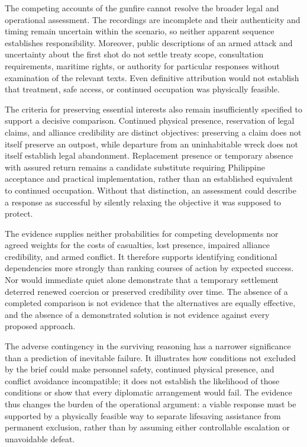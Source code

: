 \documentclass[11pt]{article}
\begin{document}
The competing accounts of the gunfire cannot resolve the broader legal and operational assessment. The recordings are incomplete and their authenticity and timing remain uncertain within the scenario, so neither apparent sequence establishes responsibility. Moreover, public descriptions of an armed attack and uncertainty about the first shot do not settle treaty scope, consultation requirements, maritime rights, or authority for particular responses without examination of the relevant texts. Even definitive attribution would not establish that treatment, safe access, or continued occupation was physically feasible.

The criteria for preserving essential interests also remain insufficiently specified to support a decisive comparison. Continued physical presence, reservation of legal claims, and alliance credibility are distinct objectives: preserving a claim does not itself preserve an outpost, while departure from an uninhabitable wreck does not itself establish legal abandonment. Replacement presence or temporary absence with assured return remains a candidate substitute requiring Philippine acceptance and practical implementation, rather than an established equivalent to continued occupation. Without that distinction, an assessment could describe a response as successful by silently relaxing the objective it was supposed to protect.

The evidence supplies neither probabilities for competing developments nor agreed weights for the costs of casualties, lost presence, impaired alliance credibility, and armed conflict. It therefore supports identifying conditional dependencies more strongly than ranking courses of action by expected success. Nor would immediate quiet alone demonstrate that a temporary settlement deterred renewed coercion or preserved credibility over time. The absence of a completed comparison is not evidence that the alternatives are equally effective, and the absence of a demonstrated solution is not evidence against every proposed approach.

The adverse contingency in the surviving reasoning has a narrower significance than a prediction of inevitable failure. It illustrates how conditions not excluded by the brief could make personnel safety, continued physical presence, and conflict avoidance incompatible; it does not establish the likelihood of those conditions or show that every diplomatic arrangement would fail. The evidence thus changes the burden of the operational argument: a viable response must be supported by a physically feasible way to separate lifesaving assistance from permanent exclusion, rather than by assuming either controllable escalation or unavoidable defeat.
\end{document}
